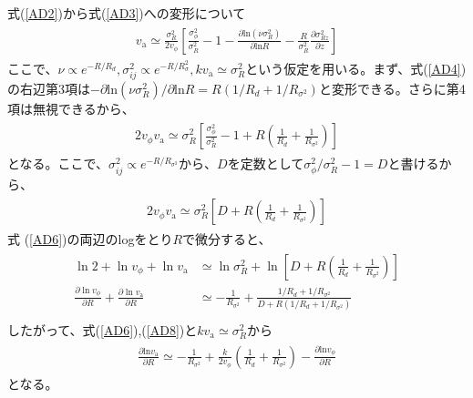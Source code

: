 式(\ref{AD2})から式(\ref{AD3})への変形について
\begin{align}
\begin{aligned}
    v_{\mathrm{a}} \simeq \frac{\sigma_R^2}{2v_{\phi}} \left[\frac{\sigma_{\phi}^2}{\sigma_R^2} - 1 - \frac{\partial \mathrm{ln}(\nu \sigma_R^2)}{\partial \mathrm{ln} R} - \frac{R}{\sigma_R^2}\frac{\partial \sigma_{Rz}^2}{\partial z}\right]
\end{aligned} \label{AD4}
\end{align}
ここで、$\nu \propto e^{
-R/R_d},\sigma_{ij}^2 \propto e^{-R/R_{\sigma}^2}, kv_{\mathrm{a}} \simeq \sigma_{R}^2$という仮定を用いる。まず、式(\ref{AD4})の右辺第3項は$-\partial \mathrm{ln}(\nu \sigma_R^2)/\partial \mathrm{ln} R = R(1/R_d + 1/R_{\sigma^2})$と変形できる。さらに第4項は無視できるから、
\begin{align}
\begin{aligned}
    2v_{\phi}v_{\mathrm{a}} \simeq \sigma_R^2 \left[\frac{\sigma_{\phi}^2}{\sigma_R^2} - 1 + R\left(\frac{1}{R_d} + \frac{1}{R_{\sigma^2}}\right)\right]
\end{aligned} \label{AD5}
\end{align}
となる。ここで、$\sigma_{ij}^2 \propto e^{-R/R_{\sigma^2}}$から、$D$を定数として$\sigma_{\phi}^2/\sigma_R^2 - 1 = D$と書けるから、
\begin{align}
\begin{aligned}
    2v_{\phi}v_{\mathrm{a}} \simeq \sigma_R^2 \left[D + R\left(\frac{1}{R_d} + \frac{1}{R_{\sigma^2}}\right)\right]
\end{aligned} \label{AD6}
\end{align}
式 (\ref{AD6})の両辺のlogをとり$R$で微分すると、
\begin{align}
\begin{aligned}
    \ln2+\ln v_{\phi}+\ln v_{\mathrm{a}} &\simeq \ln \sigma_R^2 +\ln \left[D + R\left(\frac{1}{R_d} + \frac{1}{R_{\sigma^2}}\right)\right] \\
    \frac{\partial \ln v_{\phi}}{\partial R}+\frac{\partial \ln v_{\mathrm{a}}}{\partial R} &\simeq -\frac{1}{R_{\sigma^2}} + \frac{1/R_d + 1/R_{\sigma^2}}{D +R\left(1/R_d + 1/R_{\sigma^2}\right)} \\
\end{aligned} \label{AD8}
\end{align}
したがって、式(\ref{AD6}),(\ref{AD8})と$kv_{\mathrm{a}} \simeq \sigma_R^2$から
\begin{align}
\begin{aligned}
    \frac{\partial \mathrm{ln}v_{\mathrm{a}}}{\partial R} \simeq -\frac{1}{R_{\sigma^2}} + \frac{k}{2v_{\phi}}\left(\frac{1}{R_d} + \frac{1}{R_{\sigma^2}}\right) - \frac{\partial \mathrm{ln}v_{\phi}}{\partial R}
\end{aligned} \label{AD9}
\end{align}
となる。

